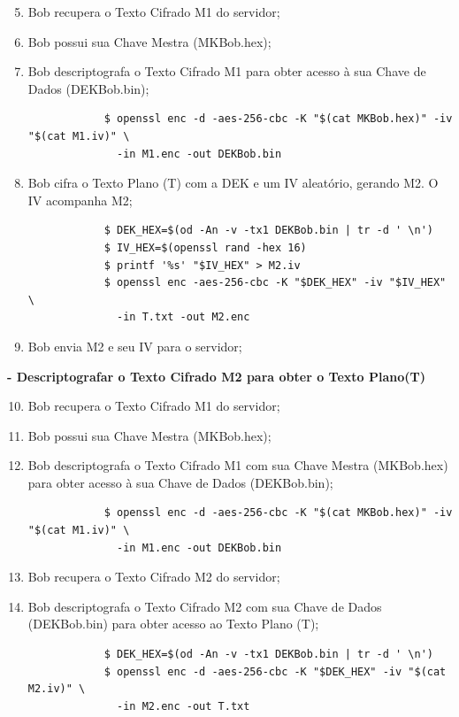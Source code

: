 \begin{enumerate}
	\setcounter{enumi}{4} %
	\item Bob recupera o Texto Cifrado M1 do servidor;
	\item Bob possui sua Chave Mestra (MKBob.hex);
	\item Bob descriptografa o Texto Cifrado M1 para obter acesso à sua Chave de Dados (DEKBob.bin);
	\begin{tcolorbox}[width=\textwidth]
		{\scriptsize
			\begin{verbatim}
			$ openssl enc -d -aes-256-cbc -K "$(cat MKBob.hex)" -iv "$(cat M1.iv)" \
			  -in M1.enc -out DEKBob.bin
			\end{verbatim}
		}
	\end{tcolorbox}
	\item Bob cifra o Texto Plano (T) com a DEK e um IV aleatório, gerando M2. O IV acompanha M2;
	\begin{tcolorbox}[width=\textwidth]
		{\small
			\begin{verbatim}
			$ DEK_HEX=$(od -An -v -tx1 DEKBob.bin | tr -d ' \n')
			$ IV_HEX=$(openssl rand -hex 16)
			$ printf '%s' "$IV_HEX" > M2.iv
			$ openssl enc -aes-256-cbc -K "$DEK_HEX" -iv "$IV_HEX" \
			  -in T.txt -out M2.enc
			\end{verbatim}
		}
	\end{tcolorbox}
	\item Bob envia M2 e seu IV para o servidor;
\end{enumerate}

\textbf{- Descriptografar o Texto Cifrado M2 para obter o Texto Plano(T)}

\begin{enumerate}
	\setcounter{enumi}{9} %
	\item Bob recupera o Texto Cifrado M1 do servidor;
	\item Bob possui sua Chave Mestra (MKBob.hex);
	\item Bob descriptografa o Texto Cifrado M1 com sua Chave Mestra (MKBob.hex) para obter acesso à sua Chave de Dados (DEKBob.bin);
	\begin{tcolorbox}[width=\textwidth]
		{\scriptsize
			\begin{verbatim}
			$ openssl enc -d -aes-256-cbc -K "$(cat MKBob.hex)" -iv "$(cat M1.iv)" \
			  -in M1.enc -out DEKBob.bin
			\end{verbatim}
		}
	\end{tcolorbox}
	\item Bob recupera o Texto Cifrado M2 do servidor;
	\item Bob descriptografa o Texto Cifrado M2 com sua Chave de Dados (DEKBob.bin) para obter acesso ao Texto Plano (T);
	\begin{tcolorbox}[width=\textwidth]
		{\small
			\begin{verbatim}
			$ DEK_HEX=$(od -An -v -tx1 DEKBob.bin | tr -d ' \n')
			$ openssl enc -d -aes-256-cbc -K "$DEK_HEX" -iv "$(cat M2.iv)" \
			  -in M2.enc -out T.txt
			\end{verbatim}
		}
	\end{tcolorbox}
\end{enumerate}

